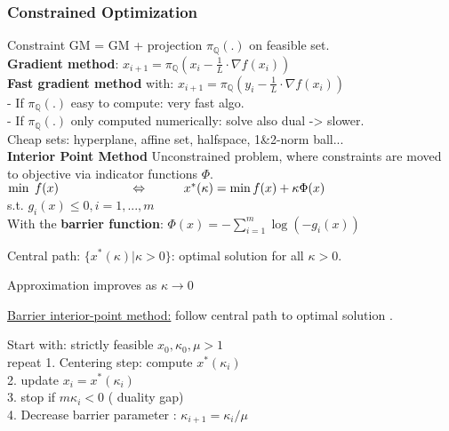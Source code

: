 \documentclass[10pt,parskip]{scrartcl}
\begin{document}
\begin{multicols*}{3}
\subsubsection{Constrained Optimization}
Constraint GM = GM + projection $\pi_{\mathbb{Q}}(.)$ on feasible set. \\
\textbf{Gradient method}: $x_{i+1} = \pi_{\mathbb{Q}}(x_i - \frac{1}{L} \cdot \nabla f(x_i))$\\
\textbf{Fast gradient method} with: $x_{i+1} = \pi_{\mathbb{Q}}(y_i - \frac{1}{L} \cdot \nabla f(x_i))$\\
- If $\pi_{\mathbb{Q}}(.)$ easy to compute: very fast algo.\\
- If $\pi_{\mathbb{Q}}(.)$ only computed numerically: solve also dual -> slower. \\
Cheap sets: hyperplane, affine set, halfspace, 1\&2-norm ball...\\
\textbf{Interior Point Method}
Unconstrained problem, where constraints are moved to objective via indicator functions $\Phi$.\\
$\min \hspace{0.1cm} f(x) \hspace{2cm} \Leftrightarrow \hspace{1cm} x^*(\kappa) = \min f(x) + \kappa \Phi (x)$\\
s.t. $g_i(x) \leq 0, i=1,...,m$\\
With the \textbf{barrier function}: $\Phi(x) = - \sum\limits_{i=1}^m \log (-g_i(x))$

Central path: $\{x^*(\kappa)|\kappa>0\}$: optimal solution for all $\kappa > 0$.

Approximation improves as $\kappa \rightarrow 0$

\underline{Barrier interior-point method:} follow central path to optimal solution .

Start with: strictly feasible $x_0, \kappa_0, \mu>1$\\
repeat \hspace*{5mm}1. Centering step: compute $x^*(\kappa_i)$\\
	\hspace*{15mm}2. update $x_i = x^*(\kappa_i)$\\
	\hspace*{15mm}3. stop if $m \kappa_i<0$ ( duality gap)\\
	\hspace*{15mm}4. Decrease barrier parameter : $\kappa_{i+1} = \kappa_i/\mu$



\end{multicols*}
\end{document}
